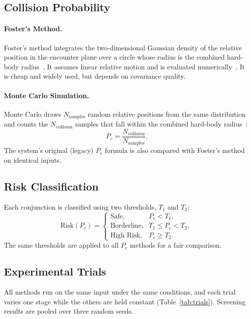\documentclass[runningheads]{llncs}
\begin{document}
\subsection{Collision Probability}
\paragraph{Foster's Method.}
Foster's method integrates the two-dimensional Gaussian density of the relative position in the encounter plane over a circle whose radius is the combined hard-body radius~\cite{b24,b29}. It assumes linear relative motion and is evaluated numerically~\cite{b30}. It is cheap and widely used, but depends on covariance quality.

\paragraph{Monte Carlo Simulation.}
Monte Carlo draws $N_{\mathrm{samples}}$ random relative positions from the same distribution and counts the $N_{\mathrm{collision}}$ samples that fall within the combined hard-body radius~\cite{b7,b24}:
\begin{equation}
P_c = \frac{N_{\mathrm{collision}}}{N_{\mathrm{samples}}} .
\label{eq:mc}
\end{equation}
The system's original (legacy) $P_c$ formula is also compared with Foster's method on identical inputs.

\subsection{Risk Classification}
Each conjunction is classified using two thresholds, $T_1$ and $T_2$:
\begin{equation}
\mathrm{Risk}(P_c) =
\begin{cases}
\text{Safe}, & P_c < T_1,\\
\text{Borderline}, & T_1 \le P_c < T_2,\\
\text{High Risk}, & P_c \ge T_2.
\end{cases}
\label{eq:risk}
\end{equation}
The same thresholds are applied to all $P_c$ methods for a fair comparison.

\subsection{Experimental Trials}
All methods run on the same input under the same conditions, and each trial varies one stage while the others are held constant (Table~\ref{tab:trials}). Screening results are pooled over three random seeds.
\end{document}
